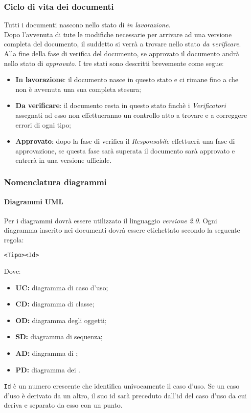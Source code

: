 \documentclass{scalatekids-article}
\begin{document}
\subsubsection{Ciclo di vita dei documenti}
Tutti i documenti nascono nello stato di \textit{in lavorazione}.\\
Dopo l'avvenuta di tute le modifiche necessarie per arrivare ad una versione completa del documento, il suddetto si verrà a trovare nello stato \textit{da verificare}.\\
Alla fine della fase di verifica del documento, se approvato il documento andrà nello stato di \textit{approvato}.
I tre stati sono descritti brevemente come segue:
\begin{itemize}
\item \textbf{In lavorazione}: il documento nasce in questo stato e ci rimane fino a che non è avvenuta una sua completa stesura;
\item \textbf{Da verificare}: il documento resta in questo stato finchè i \textit{Verificatori} assegnati ad esso non effettueranno un controllo atto a trovare e a correggere errori di ogni tipo;
\item \textbf{Approvato}: dopo la fase di verifica il \textit{Responsabile} effettuerà una fase di approvazione, se questa fase sarà superata il documento sarà approvato e entrerà in una versione ufficiale.
\end{itemize}

\subsubsection{Nomenclatura diagrammi}
\paragraph{Diagrammi UML}
Per i diagrammi dovrà essere utilizzato il linguaggio 
\textit{versione 2.0}. Ogni diagramma inserito nei documenti dovrà essere
etichettato secondo la seguente regola:
\begin{center}
  \verb=<Tipo><Id>=
\end{center}
Dove:
\begin{itemize}
\item\textbf{UC:} diagramma di caso d'uso;
\item\textbf{CD:} diagramma di classe;
\item\textbf{OD:} diagramma degli oggetti;
\item\textbf{SD:} diagramma di sequenza;
\item\textbf{AD:} diagramma di ;
\item\textbf{PD:} diagramma dei .
\end{itemize}
\verb=Id= è un numero crescente che identifica
univocamente il caso d'uso. Se un caso d'uso è derivato da un altro, il suo id
sarà preceduto dall'id del caso d'uso da cui deriva e separato da esso con un
punto.
\end{document}
